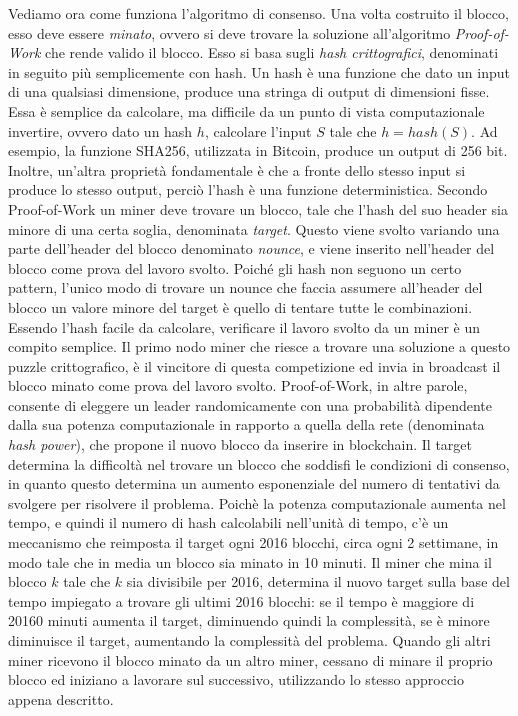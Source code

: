 Vediamo ora come funziona l'algoritmo di consenso. Una volta costruito il blocco, esso deve essere \emph{minato}, ovvero si deve trovare la soluzione all'algoritmo \emph{Proof-of-Work} che rende valido il blocco. Esso si basa sugli \emph{hash crittografici}, denominati in seguito più semplicemente con hash. Un hash è una funzione che dato un input di una qualsiasi dimensione, produce una stringa di output di dimensioni fisse. Essa è semplice da calcolare, ma difficile da un punto di vista computazionale invertire, ovvero dato un hash $h$, calcolare l'input $S$ tale che $h = hash(S)$. Ad esempio, la funzione SHA256, utilizzata in Bitcoin, produce un output di 256 bit. Inoltre, un'altra proprietà fondamentale è che a fronte dello stesso input si produce lo stesso output, perciò l'hash è una funzione deterministica. Secondo Proof-of-Work un miner deve trovare un blocco, tale che l'hash del suo header sia minore di una certa soglia, denominata \emph{target}. Questo viene svolto variando una parte dell'header del blocco denominato \emph{nounce}, e viene inserito nell'header del blocco come prova del lavoro svolto. Poiché gli hash non seguono un certo pattern, l'unico modo di trovare un nounce che faccia assumere all'header del blocco un valore minore del target è quello di tentare tutte le combinazioni. Essendo l'hash facile da calcolare, verificare il lavoro svolto da un miner è un compito semplice. Il primo nodo miner che riesce a trovare una soluzione a questo puzzle crittografico, è il vincitore di questa competizione ed invia in broadcast il blocco minato come prova del lavoro svolto. Proof-of-Work, in altre parole, consente di eleggere un leader randomicamente con una probabilità dipendente dalla sua potenza computazionale in rapporto a quella della rete (denominata \emph{hash power}), che propone il nuovo blocco da inserire in blockchain.
Il target determina la difficoltà nel trovare un blocco che soddisfi le condizioni di consenso, in quanto questo determina un aumento esponenziale del numero di tentativi da svolgere per risolvere il problema. Poichè la potenza computazionale aumenta nel tempo, e quindi il numero di hash calcolabili nell'unità di tempo, c'è un meccanismo che reimposta il target ogni 2016 blocchi, circa ogni 2 settimane, in modo tale che in media un blocco sia minato in 10 minuti. Il miner che mina il blocco $k$ tale che $k$ sia divisibile per 2016, determina il nuovo target sulla base del tempo impiegato a trovare gli ultimi 2016 blocchi: se il tempo è maggiore di 20160 minuti aumenta il target, diminuendo quindi la complessità, se è minore diminuisce il target, aumentando la complessità del problema.
Quando gli altri miner ricevono il blocco minato da un altro miner, cessano di minare il proprio blocco ed iniziano a lavorare sul successivo, utilizzando lo stesso approccio appena descritto.

